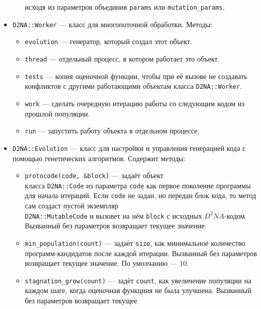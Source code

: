 \documentclass[utf8,a5paper,portrait,10pt,twoside]{eskdtext}
\begin{document}
\begin{itemize}
\begin{itemize}
               исходя из параметров объединив \texttt{params} или
               \texttt{mutation\_params}.
       \end{itemize}
  \item \texttt{D2NA::Worker} — класс для многопоточной обработки. Методы:
      \begin{itemize}
        \item \texttt{evolution} — генератор, который создал этот объект.
        \item \texttt{thread} — отдельный процесс, в котором работает это
              объект.
        \item \texttt{tests} — копия оценочной функции, чтобы при её вызове
              не создавать конфликтов с другими работающими объектам класса
              \texttt{D2NA::Worker}.
        \item \texttt{work} — сделать очередную итерацию работы со следующим
              кодом из прошлой популяции.
        \item \texttt{run} — запустить работу объекта в отдельном процессе.
      \end{itemize}
  \item \texttt{D2NA::Evolution} — класс для настройки и управления генерацией
        кода с помощью генетических алгоритмов. Содержит методы:
        \begin{itemize}
          \item \texttt{protocode(code, \&block)} — задаёт объект\\ класса
                \texttt{D2NA::Code} из параметра \texttt{code} как первое
                поколение программы для начала итераций. Если \texttt{code} не
                задан, но передан блок кода, то метод сам создаст пустой
                экземпляр\\ \texttt{D2NA::MutableCode} и вызовет на нём
                \texttt{block} с исходных $D^2NA$-кодом. Вызванный без
                параметров возвращает текущее значение.
          \item \texttt{min\_population(count)} — задаёт \texttt{size}, как
                минимальное количество программ-кандидатов после каждой
                итерации. Вызванный без параметров возвращает текущее значение.
                По умолчанию — 10.
          \item \texttt{stagnation\_grow(count)} — задёт \texttt{count}, как
                увеличение популяции на каждом шаге, когда оценочная функциия
                не была улучшена. Вызванный без параметров возвращает текущее

\end{itemize}
\end{itemize}
\end{document}
